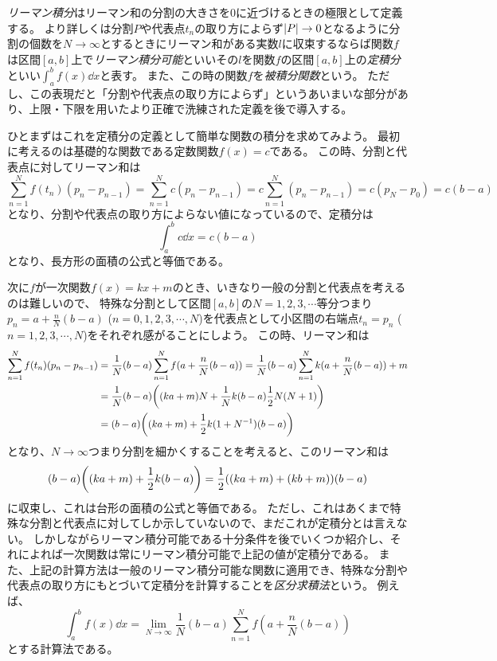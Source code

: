 \emph{リーマン積分}はリーマン和の分割の大きさを$0$に近づけるときの極限として定義する。
より詳しくは分割$P$や代表点$t_n$の取り方によらず$\abs{P} \to 0$となるように分割の個数を$N \to \infty$とするときにリーマン和がある実数$l$に収束するならば関数$f$は区間$[a, b]$上で\emph{リーマン積分可能}といいその$l$を関数$f$の区間$[a, b]$上の\emph{定積分}といい$\int_a^b f(x)\dd{x}$と表す。
また、この時の関数$f$を\emph{被積分関数}という。
ただし、この表現だと「分割や代表点の取り方によらず」というあいまいな部分があり、上限・下限を用いたより正確で洗練された定義を後で導入する。

ひとまずはこれを定積分の定義として簡単な関数の積分を求めてみよう。
最初に考えるのは基礎的な関数である定数関数$f(x) = c$である。
この時、分割と代表点に対してリーマン和は
$$
\sum_{n = 1}^N f(t_n)(p_n-p_{n-1}) = \sum_{n = 1}^N c(p_n-p_{n-1}) = c\sum_{n = 1}^N (p_n-p_{n-1}) = c(p_N-p_0) = c(b-a)
$$
となり、分割や代表点の取り方によらない値になっているので、定積分は
$$
\int_a^b c\dd{x} = c(b-a)
$$
となり、長方形の面積の公式と等価である。

次に$f$が一次関数$f(x) = k x+m$のとき、いきなり一般の分割と代表点を考えるのは難しいので、
特殊な分割として区間$[a, b]$の$N = 1, 2, 3, \cdots$等分つまり$p_n = a+\frac{n}{N}(b-a)$ ($n = 0, 1, 2, 3, \cdots, N$)を代表点として小区間の右端点$t_n = p_n$ ($n = 1, 2, 3, \cdots, N$)をそれぞれ感がることにしよう。
この時、リーマン和は
$$
\begin{aligned}
\sum_{n = 1}^N f(t_n)(p_n-p_{n-1})
&= \frac{1}{N}(b-a)\sum_{n = 1}^N f(a+\frac{n}{N}(b-a))
= \frac{1}{N}(b-a)\sum_{n = 1}^N k(a+\frac{n}{N}(b-a))+m \\
&= \frac{1}{N}(b-a)\qty((k a+m)N+\frac{1}{N}k(b-a)\frac{1}{2}N(N+1)) \\
&= (b-a)\qty((k a+m)+\frac{1}{2}k(1+N^{-1})(b-a))
\end{aligned}
$$
となり、$N \to \infty$つまり分割を細かくすることを考えると、このリーマン和は
$$
(b-a)\qty((k a+m)+\frac{1}{2}k(b-a)) = \frac{1}{2}((k a+m)+(k b+m))(b-a)
$$
に収束し、これは台形の面積の公式と等価である。
ただし、これはあくまで特殊な分割と代表点に対してしか示していないので、まだこれが定積分とは言えない。
しかしながらリーマン積分可能である十分条件を後でいくつか紹介し、それによれば一次関数は常にリーマン積分可能で上記の値が定積分である。
また、上記の計算方法は一般のリーマン積分可能な関数に適用でき、特殊な分割や代表点の取り方にもとづいて定積分を計算することを\emph{区分求積法}という。
例えば、
$$
\int_a^b f(x)\dd{x} = \lim_{N \to \infty}\frac{1}{N}(b-a)\sum_{n = 1}^N f(a+\frac{n}{N}(b-a))
$$
とする計算法である。

